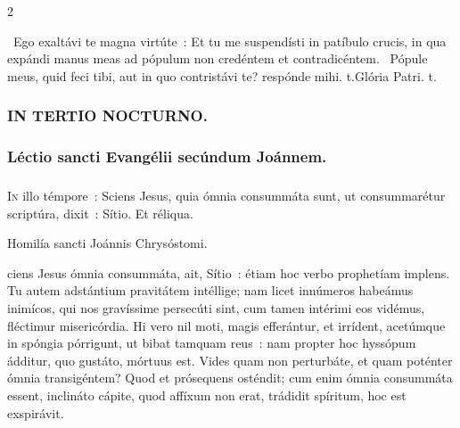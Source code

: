 \documentclass[9pt,twoside]{extarticle}
\begin{document}
\begin{multicols}{2}
\begin{tightlist}{}
\item {}~Ego exaltávi te magna virtúte~: \textred{*} Et tu me suspendísti in patíbulo crucis, in qua expándi manus meas ad pópulum non credéntem et contradicéntem. ~Pópule meus, quid feci tibi, aut in quo contristávi te? respónde mihi. t.Glória Patri. t.
\end{tightlist}
\subsubsection*{\center \textsc{IN TERTIO NOCTURNO.}}

\subsubsection*{\center Léctio sancti Evangélii secúndum Joánnem.}
\subsubsection*{\center {}}
\lettrine{I}n illo témpore~: Sciens Jesus, quia ómnia consummáta sunt, ut consummarétur scriptúra, dixit~: Sítio. Et réliqua.

\begin{center}Homilía sancti Joánnis Chrysóstomi.\\
\end{center}
ciens Jesus ómnia consummáta, ait, Sítio~: étiam hoc verbo prophetíam implens. Tu autem adstántium pravitátem intéllige; nam licet innúmeros habeámus inimícos, qui nos gravíssime persecúti sint, cum tamen intérimi eos vidémus, fléctimur misericórdia. Hi vero nil moti, magis efferántur, et irrídent, acetúmque in spóngia pórrigunt, ut bibat tamquam reus~: nam propter hoc hyssópum ádditur, quo gustáto, mórtuus est. Vides quam non perturbáte, et quam poténter ómnia transigéntem? Quod et prósequens osténdit; cum enim ómnia consummáta essent, inclináto cápite, quod affíxum non erat, trádidit spíritum, hoc est exspirávit.


\end{multicols}
\end{document}
